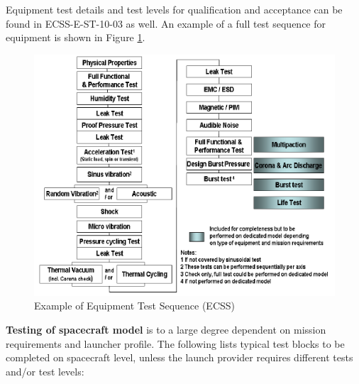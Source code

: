 Equipment test details and test levels for qualification and acceptance can be found in ECSS-E-ST-10-03 \cite{ECSS-E-ST-10-03} as well. An example of a full test sequence for equipment is shown in Figure \ref{fig:Example of Equipment Test Sequence}. 

\begin{figure}[h]
\centering\includegraphics[scale=0.7]{fig/example_of_equipment_test_sequence}
\caption{Example of Equipment Test Sequence (ECSS)}
\label{fig:Example of Equipment Test Sequence}
\end{figure}

\textbf{Testing of spacecraft model} is to a large degree dependent on mission requirements and launcher profile. The following lists typical test blocks to be completed on spacecraft level, unless the launch provider requires different tests and/or test levels:

